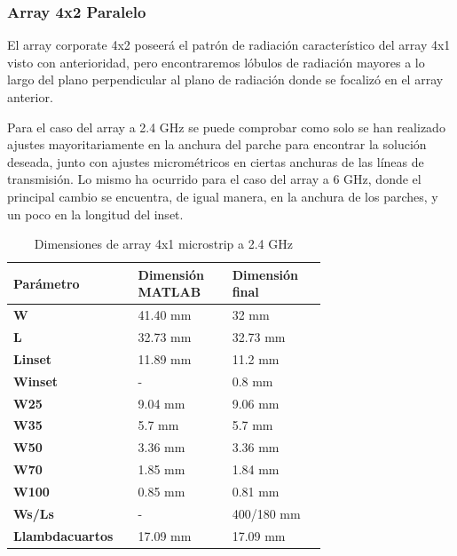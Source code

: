\subsubsection{Array 4x2 Paralelo} 
\par El array corporate 4x2 poseerá el patrón de radiación característico del array 4x1 visto con anterioridad, pero encontraremos lóbulos de radiación mayores a lo largo del plano perpendicular al plano de radiación donde se focalizó en el array anterior. 
\\
\par Para el caso del array a 2.4 GHz se puede comprobar como solo se han realizado ajustes mayoritariamente en la anchura del parche para encontrar la solución deseada, junto con ajustes micrométricos en ciertas anchuras de las líneas de transmisión. Lo mismo ha ocurrido para el caso del array a 6 GHz, donde el principal cambio se encuentra, de igual manera, en la anchura de los parches, y un poco en la longitud del inset.
\\
\begin{table}[H]
  
   \label{tab:array4x11}
   \small %
   \centering %
   \begin{tabular}{m{0.2\linewidth}m{0.25\linewidth}m{0.25\linewidth}} %
   \toprule[\heavyrulewidth]\toprule[\heavyrulewidth]
   \textbf{Parámetro} & \textbf{Dimensión MATLAB} & \textbf{Dimensión final} \\ 
   \midrule
   \textbf{W} & 41.40 mm & 32 mm \\
   \textbf{L} & 32.73 mm & 32.73 mm\\
   \textbf{Linset} & 11.89 mm & 11.2 mm\\
   \textbf{Winset} & - & 0.8 mm\\
   \textbf{W25} & 9.04 mm & 9.06 mm\\
   \textbf{W35} & 5.7 mm & 5.7 mm\\
   \textbf{W50} & 3.36 mm & 3.36 mm\\
   \textbf{W70} & 1.85 mm & 1.84 mm\\
   \textbf{W100} & 0.85 mm & 0.81 mm\\
   \textbf{Ws/Ls} & - & 400/180 mm\\
   \textbf{Llambdacuartos} & 17.09 mm & 17.09 mm\\
   \bottomrule[\heavyrulewidth] 
   \end{tabular}
   \caption{Dimensiones de array 4x1 microstrip a 2.4 GHz} 
\end{table}


